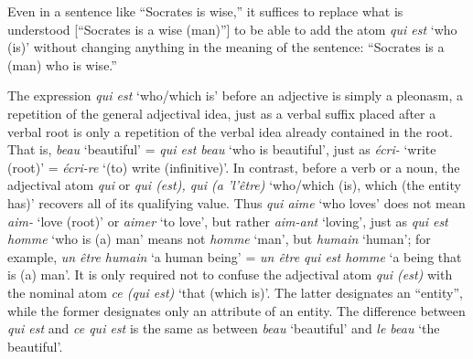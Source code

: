 \begin{sloppypar}
{}

 {\noindent Even in a sentence like ``Socrates is wise,'' it suffices
  to replace what is understood {[``Socrates is a wise (man)'']} to be
  able to add the atom \emph{qui est} `who (is)' without changing
  anything in the meaning of the sentence: ``Socrates is a (man) who
  is wise.''

  The expression \emph{qui est} `who/which is' before an adjective is
  simply a pleonasm, a repetition of the general adjectival idea, just
  as a verbal suffix placed after a verbal root is only a repetition
  of the verbal idea already contained in the root. That is,
  \emph{beau} `beautiful' = \emph{qui est beau} `who is beautiful',
  just as \emph{écri-} `write (root)' = \emph{écri-re} `(to) write
  (infinitive)'. In contrast, before a verb or a noun, the adjectival
  atom \emph{qui} or \emph{qui (est), qui (a 'l'être)} `who/which
  (is), which (the entity has)' recovers all of its qualifying
  value. Thus \emph{qui aime} `who loves' does not mean \emph{aim-}
  `love (root)' or \emph{aimer} `to love', but rather \emph{aim-ant}
  `loving', just as \emph{qui est homme} `who is (a) man' means not
  \emph{homme} `man', but \emph{humain} `human'; for example, \emph{un
    être humain} `a human being' = \emph{un être qui est homme} `a
  being that is (a) man'.  It is only required not to confuse the
  adjectival atom \emph{qui (est)} with the nominal atom \emph{ce (qui
    est)} `that (which is)'. The latter designates an ``entity'',
  while the former designates only an attribute of an entity. The
  difference between \emph{qui est} and \emph{ce qui est} is the same
  as between \emph{beau} `beautiful' and \emph{le beau} `the
  beautiful'.

}
\end{sloppypar}
